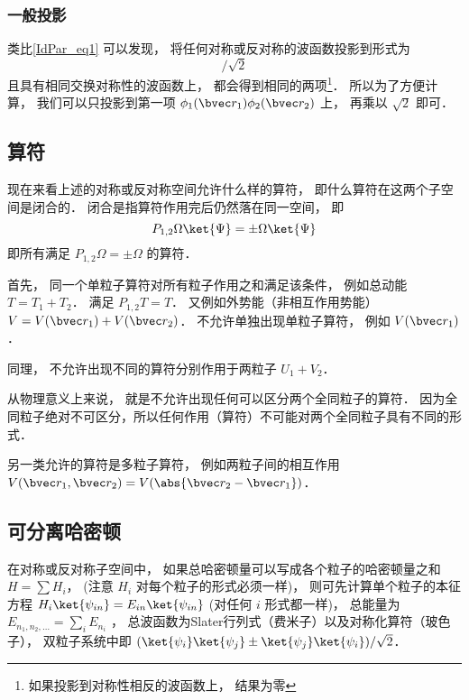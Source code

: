 \subsubsection{一般投影}
类比\autoref{IdPar_eq1} 可以发现， 将任何对称或反对称的波函数投影到形式为
\begin{equation}
[\phi_1(\bvec r_1)\phi_2(\bvec r_2) \pm \phi_2(\bvec r_1)\phi_1(\bvec r_2)]/\sqrt{2}
\end{equation}
且具有相同交换对称性的波函数上， 都会得到相同的两项\footnote{如果投影到对称性相反的波函数上， 结果为零}． 所以为了方便计算， 我们可以只投影到第一项 $\phi_1(\bvec r_1)\phi_2(\bvec r_2)$ 上， 再乘以 $\sqrt{2}$ 即可．

\subsection{算符}
现在来看上述的对称或反对称空间允许什么样的算符， 即什么算符在这两个子空间是闭合的． 闭合是指算符作用完后仍然落在同一空间， 即
\begin{equation}
P_{1,2}\Omega\ket{\Psi} = \pm \Omega \ket{\Psi}
\end{equation}
即所有满足 $P_{1,2}\Omega = \pm \Omega$ 的算符．

首先， 同一个单粒子算符对所有粒子作用之和满足该条件， 例如总动能 $T = T_1 + T_2$． 满足 $P_{1,2}T = T$． 又例如外势能（非相互作用势能） $V = V(\bvec r_1) + V(\bvec r_2)$． 不允许单独出现单粒子算符， 例如 $V(\bvec r_1)$．

同理， 不允许出现不同的算符分别作用于两粒子 $U_1 + V_2$．

从物理意义上来说， 就是不允许出现任何可以区分两个全同粒子的算符． 因为全同粒子绝对不可区分，所以任何作用（算符）不可能对两个全同粒子具有不同的形式．

另一类允许的算符是多粒子算符， 例如两粒子间的相互作用 $V(\bvec r_1, \bvec r_2) = V(\abs{\bvec r_2 - \bvec r_1})$．

\subsection{可分离哈密顿}
在对称或反对称子空间中， 如果总哈密顿量可以写成各个粒子的哈密顿量之和 $H = \sum H_i$， (注意 $H_i$ 对每个粒子的形式必须一样)， 则可先计算单个粒子的本征方程 $H_i \ket{\psi_{in}} = E_{in}\ket{\psi_{in}}$ (对任何 $i$ 形式都一样)， 总能量为 $E_{n_1,n_2,\dots} = \sum_i E_{n_i}$ ， 总波函数为Slater行列式（费米子）以及对称化算符（玻色子）， 双粒子系统中即 $(\ket{\psi_i}\ket{\psi_j} \pm \ket{\psi_j}\ket{\psi_i})/\sqrt{2}$．

